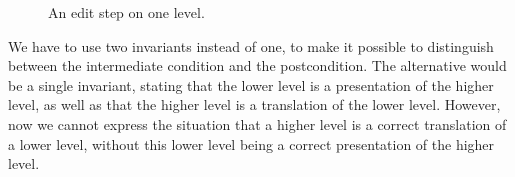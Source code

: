 \begin{figure}
\begin{small}
\begin{center}
\begin{center}
\end{center}\caption{An edit step on one level.}\label{layerEditProcess} 
\end{center}
\end{small}
\end{figure}

We have to use two invariants instead of one, to make it possible to distinguish between the intermediate condition and the postcondition. The alternative would be a single invariant, stating that the lower level is a presentation of the higher level, as well as that the higher level is a translation of the lower level. However, now we cannot express the situation that a higher level is a correct translation of a lower level, without this lower level being a correct presentation of the higher level.

